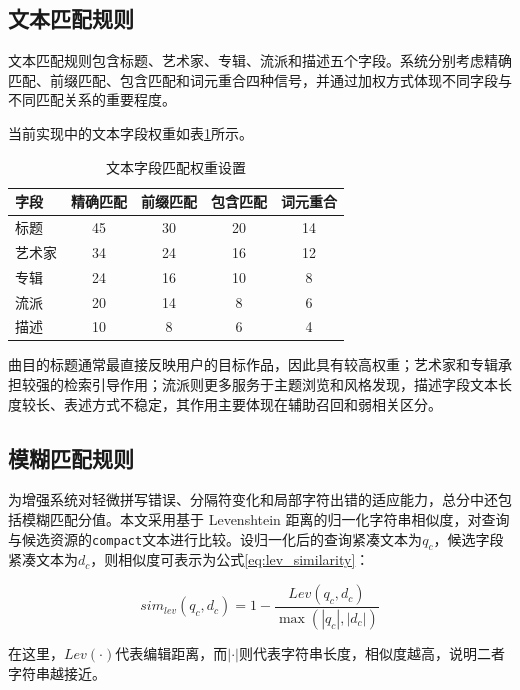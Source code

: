 \subsection{文本匹配规则}

文本匹配规则包含标题、艺术家、专辑、流派和描述五个字段。系统分别考虑精确匹配、前缀匹配、包含匹配和词元重合四种信号，并通过加权方式体现不同字段与不同匹配关系的重要程度。

当前实现中的文本字段权重如表\ref{tab:text_matching_weights}所示。

\begin{table}[htbp]
    \linespread{1.5}
    \songti
    \centering
    \caption{文本字段匹配权重设置}\label{tab:text_matching_weights}
    \begin{tabular}{|l|c|c|c|c|}
        \hline
        字段  & 精确匹配 & 前缀匹配 & 包含匹配 & 词元重合 \\ \hline
        标题  & 45   & 30   & 20   & 14   \\ \hline
        艺术家 & 34   & 24   & 16   & 12   \\ \hline
        专辑  & 24   & 16   & 10   & 8    \\ \hline
        流派  & 20   & 14   & 8    & 6    \\ \hline
        描述  & 10   & 8    & 6    & 4    \\ \hline
    \end{tabular}
\end{table}

曲目的标题通常最直接反映用户的目标作品，因此具有较高权重；艺术家和专辑承担较强的检索引导作用；流派则更多服务于主题浏览和风格发现，描述字段文本长度较长、表述方式不稳定，其作用主要体现在辅助召回和弱相关区分。

\subsection{模糊匹配规则}

为增强系统对轻微拼写错误、分隔符变化和局部字符出错的适应能力，总分中还包括模糊匹配分值。本文采用基于 Levenshtein 距离的归一化字符串相似度，对查询与候选资源的\texttt{compact}文本进行比较。设归一化后的查询紧凑文本为$q_c$，候选字段紧凑文本为$d_c$，则相似度可表示为公式\eqref{eq:lev_similarity}：

\begin{equation}
    sim_{lev}(q_c,d_c)=1-\frac{Lev(q_c,d_c)}{\max(|q_c|,|d_c|)}
    \label{eq:lev_similarity}
\end{equation}

在这里，$Lev(\cdot)$代表编辑距离，而$|\cdot|$则代表字符串长度，相似度越高，说明二者字符串越接近。


